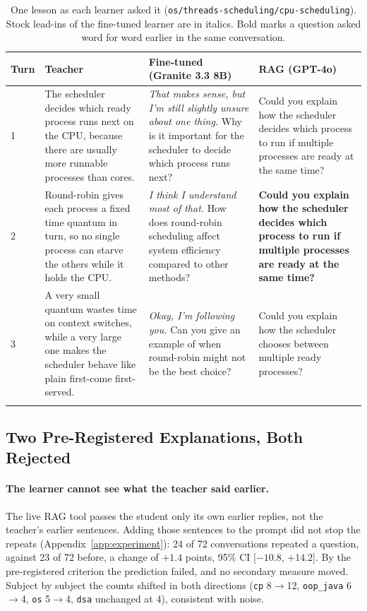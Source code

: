 \documentclass[pdflatex,sn-mathphys-num]{sn-jnl}%
\theoremstyle{thmstyleone}%
\theoremstyle{thmstyletwo}%
\theoremstyle{thmstylethree}%
\begin{document}
\begin{table}[t]
\caption{One lesson as each learner asked it (\texttt{os/threads-scheduling/cpu-scheduling}).
Stock lead-ins of the fine-tuned learner are in italics. Bold marks a question asked word for word
earlier in the same conversation.}\label{tab:transcripts}
\footnotesize
\begin{tabular*}{\textwidth}{@{\extracolsep\fill}p{}p{}p{}p{}}
\toprule
Turn & Teacher & Fine-tuned (Granite 3.3 8B) & RAG (GPT-4o) \\
\midrule
1 & The scheduler decides which ready process runs next on the CPU, because there are usually more runnable processes than cores. & \emph{That makes sense, but I'm still slightly unsure about one thing.} Why is it important for the scheduler to decide which process runs next? & Could you explain how the scheduler decides which process to run if multiple processes are ready at the same time? \\
2 & Round-robin gives each process a fixed time quantum in turn, so no single process can starve the others while it holds the CPU. & \emph{I think I understand most of that.} How does round-robin scheduling affect system efficiency compared to other methods? & \textbf{Could you explain how the scheduler decides which process to run if multiple processes are ready at the same time?} \\
3 & A very small quantum wastes time on context switches, while a very large one makes the scheduler behave like plain first-come first-served. & \emph{Okay, I'm following you.} Can you give an example of when round-robin might not be the best choice? & Could you explain how the scheduler chooses between multiple ready processes? \\
\botrule
\end{tabular*}
\end{table}

\subsection{Two Pre-Registered Explanations, Both Rejected}\label{sec:res-explain}

\paragraph{The learner cannot see what the teacher said earlier.} The live RAG tool passes the
student only its own earlier replies, not the teacher's earlier sentences. Adding those sentences to
the prompt did not stop the repeats (Appendix~\ref{app:experiment}): 24 of 72 conversations repeated a
question, against 23 of 72 before, a change of $+1.4$ points, 95\% CI [$-10.8$, $+14.2$]. By the
pre-registered criterion the prediction failed, and no secondary measure moved. Subject by subject the
counts shifted in both directions (\texttt{cp} 8$\rightarrow$12, \texttt{oop\_java} 6$\rightarrow$4,
\texttt{os} 5$\rightarrow$4, \texttt{dsa} unchanged at 4), consistent with noise.
\end{document}
